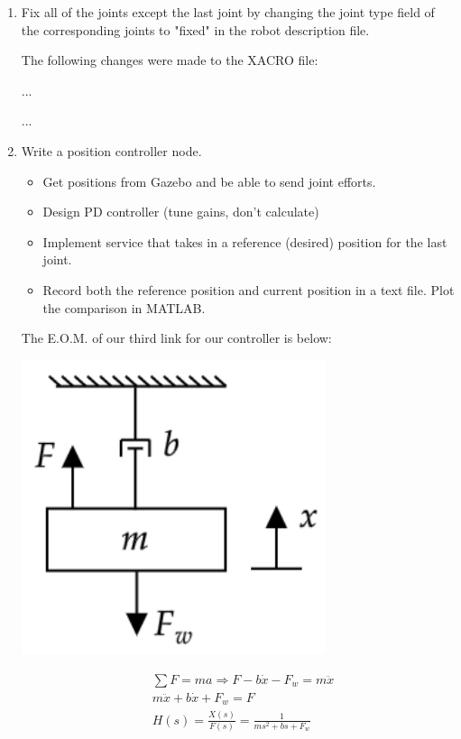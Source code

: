 \documentclass[10pt]{article}
\begin{document}
\begin{enumerate}
	\item Fix all of the joints except the last joint by changing the joint type field of the corresponding joints to "fixed" in the robot description file.
	
	The following changes were made to the XACRO file:
	
	...
	
	...
	
	\item Write a position controller node.
	
	\begin{itemize}
		\item Get positions from Gazebo and be able to send joint efforts.
		
		\item Design PD controller (tune gains, don't calculate)
		
		\item Implement service that takes in a reference (desired) position for the last joint.
		
		\item Record both the reference position and current position in a text file. Plot the comparison in MATLAB.
		
	\end{itemize}

	The E.O.M. of our third link for our controller is below:
	
	\begin{minipage}[h]{0.3\textwidth}
		\centering
		\includegraphics[width=0.7\textwidth]{figures/mass_damper.png}
	\end{minipage}
	\begin{minipage}[h]{0.5\textwidth}
		\begin{align*}
			&\sum{F} = m a \Rightarrow F - b \dot{x} - F_w = m \ddot{x} \\
			&m \ddot{x} + b \dot{x} + F_w = F \\
			&H(s) = \frac{X(s)}{F(s)} = \frac{1}{m s^2 + b s + F_w}
		\end{align*}
	\end{minipage}
	

\end{enumerate}
\end{document}
